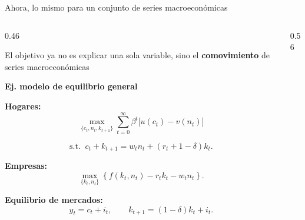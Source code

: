 \documentclass[aspectratio=169,11pt]{beamer}
\begin{document}
\begin{frame}[t]{Ahora, lo mismo para un conjunto de series macroeconómicas}

\footnotesize

\begin{columns}[T,onlytextwidth]

  \begin{column}{0.46\textwidth}

    El objetivo ya no es explicar una sola variable, sino el
    \textbf{comovimiento} de series macroeconómicas

    \vspace{0.12cm}

    \textbf{Ej. modelo de equilibrio general}

    \vspace{0.08cm}

    \textbf{Hogares:}
    \vspace{-0.2cm}
    \[
      \max_{\{c_t,n_t,k_{t+1}\}}
      \sum_{t=0}^{\infty}
      \beta^t
      \bigl[u(c_t)-v(n_t)\bigr]
    \]

    \vspace{-0.40cm}

    \[
    \text{s.t. } \ 
      c_t+k_{t+1}
      =
      w_tn_t+(r_t+1-\delta)k_t .
    \]

    \vspace{-0.05cm}

    \textbf{Empresas:}
    \vspace{-0.2cm}
    \[
      \max_{\{k_t,n_t\}}
      \left\{
      f(k_t,n_t)
      -r_tk_t-w_tn_t
      \right\}.
    \]

    \vspace{-0.05cm}

    \textbf{Equilibrio de mercados:}
    \vspace{-0.2cm}
    \[
      y_t=c_t+i_t,
      \qquad
      k_{t+1}=(1-\delta)k_t+i_t.
    \]

    \vspace{0.06cm}


  \end{column}

  \begin{column}{0.56\textwidth}
    

\end{column}
\end{columns}
\end{frame}
\end{document}
